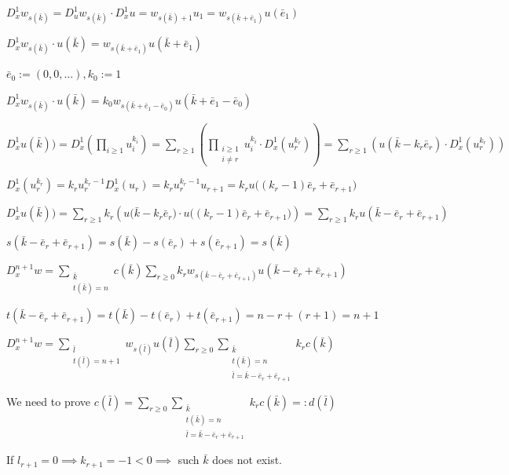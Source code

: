 \documentclass{article}
\begin{document}
$D_x^1w_{s(\bar{k})} = D_u^1w_{s(\bar{k})} \cdot D_x^1 u = w_{s(\bar{k}) + 1} u_1 = w_{s(\bar{k} + \bar{e}_1)} u(\bar{e}_1)$

$D_x^1w_{s(\bar{k})} \cdot u(\bar{k}) = w_{s(\bar{k} + \bar{e}_1)} u(\bar{k} + \bar{e}_1)$

$\bar{e}_0 := (0,0,\ldots), k_0 := 1$

$D_x^1w_{s(\bar{k})} \cdot u(\bar{k}) = k_0 w_{s(\bar{k} + \bar{e}_1 - \bar{e}_0)} u(\bar{k} + \bar{e}_1 - \bar{e}_0)$

$D_x^1 u(\bar{k})) = D_x^1 \left(\prod_{i \geq 1}u_i^{k_i}\right) = \sum_{r \geq 1} \left(\prod_{\substack{i \geq 1\\ i \neq r}}u_i^{k_i} \cdot D_x^1(u_r^{k_r})\right) = \sum_{r \geq 1} \left( u(\bar{k} - k_r \bar{e}_r) \cdot D_x^1(u_r^{k_r}) \right)$

$D_x^1(u_r^{k_r}) = k_r u_r^{k_r-1} D_x^1(u_r) = k_r u_r^{k_r - 1} u_{r+1} = k_r u\bigl((k_r-1)\bar{e}_r + \bar{e}_{r+1}\bigr)$

$D_x^1 u(\bar{k})) = \sum_{r \geq 1} k_r \left( u\bigl(\bar{k} - k_r \bar{e}_r\bigr) \cdot u\bigl((k_r-1)\bar{e}_r + \bar{e}_{r+1}\bigr) \right) = \sum_{r \geq 1} k_r u(\bar{k} - \bar{e}_r + \bar{e}_{r+1})$

$s(\bar{k} - \bar{e}_r + \bar{e}_{r+1}) = s(\bar{k}) - s(\bar{e}_r) + s(\bar{e}_{r+1}) = s(\bar{k})$

$D_x^{n+1}w = \sum_{\substack{\bar{k}\\ t(\bar{k}) = n}} c(\bar{k}) \sum_{r\geq 0} k_r w_{s(\bar{k} - \bar{e}_r + \bar{e}_{r+1})} u(\bar{k} - \bar{e}_r + \bar{e}_{r+1})$

$t(\bar{k} - \bar{e}_r + \bar{e}_{r+1}) = t(\bar{k}) - t(\bar{e}_r) + t(\bar{e}_{r+1}) = n - r + (r+1) = n + 1$

$D_x^{n+1} w = \sum_{\substack{\bar{l}\\ t(\bar{l}) = n + 1 \\ }} w_{s(\bar{l})} u(\bar{l}) \sum_{r \geq 0} \sum_{\substack{\bar{k}\\ t(\bar{k}) = n \\ \bar{l} = \bar{k} - \bar{e}_r + \bar{e}_{r+1}}} k_r c(\bar{k})$

We need to prove $c(\bar{l}) = \sum_{r \geq 0} \sum_{\substack{\bar{k}\\ t(\bar{k}) = n \\ \bar{l} = \bar{k} - \bar{e}_r + \bar{e}_{r+1}}} k_r c(\bar{k}) =: d(\bar{l})$

If $l_{r+1} = 0 \implies k_{r+1} = -1 < 0 \implies$ such $\bar{k}$ does not exist.
\end{document}
